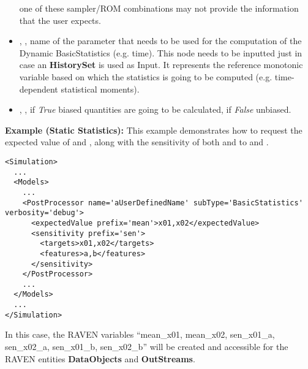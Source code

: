 \begin{itemize}
  one of these sampler/ROM combinations may not provide the information that the
  user expects.
  \\
   \item {}, , name of the parameter that needs
   to be used for the computation of the Dynamic BasicStatistics (e.g. time). This node needs to
   be inputted just in case an \textbf{HistorySet} is used as Input. It represents the reference
   monotonic variable based on which the statistics is going to be computed (e.g. time-dependent
   statistical moments).
  \item {}, , if \textit{True} biased
  quantities are going to be calculated, if \textit{False} unbiased.
\end{itemize}
\textbf{Example (Static Statistics):}  This example demonstrates how to request the expected value of
 and , along with the sensitivity of both  and  to
 and .
\begin{lstlisting}[style=XML,morekeywords={name,subType,debug}]
<Simulation>
  ...
  <Models>
    ...
    <PostProcessor name='aUserDefinedName' subType='BasicStatistics' verbosity='debug'>
      <expectedValue prefix='mean'>x01,x02</expectedValue>
      <sensitivity prefix='sen'>
        <targets>x01,x02</targets>
        <features>a,b</features>
      </sensitivity>
    </PostProcessor>
    ...
  </Models>
  ...
</Simulation>
\end{lstlisting}

In this case, the RAVEN variables ``mean\_x01, mean\_x02, sen\_x01\_a, sen\_x02\_a, sen\_x01\_b, sen\_x02\_b''
will be created and accessible for the RAVEN entities \textbf{DataObjects} and \textbf{OutStreams}. 

